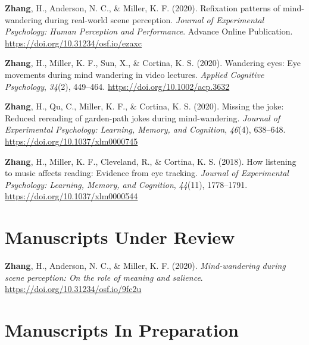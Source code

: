 \documentclass[11pt, a4paper]{awesome-cv}
\begin{document}
\begingroup
\setlength{\parindent}{-0.5in}
\setlength{\leftskip}{0.5in}

\hypertarget{refs_published}{}
\leavevmode\hypertarget{ref-zhang_scan-paths_2020}{}%
\textbf{Zhang}, H., Anderson, N. C., \& Miller, K. F. (2020). Refixation
patterns of mind-wandering during real-world scene perception.
\emph{Journal of Experimental Psychology: Human Perception and
Performance}. Advance Online Publication.
\url{https://doi.org/10.31234/osf.io/ezaxc}

\leavevmode\hypertarget{ref-zhang_wandering_2020}{}%
\textbf{Zhang}, H., Miller, K. F., Sun, X., \& Cortina, K. S. (2020).
Wandering eyes: Eye movements during mind wandering in video lectures.
\emph{Applied Cognitive Psychology}, \emph{34}(2), 449--464.
\url{https://doi.org/10.1002/acp.3632}

\leavevmode\hypertarget{ref-zhang_missing_2019}{}%
\textbf{Zhang}, H., Qu, C., Miller, K. F., \& Cortina, K. S. (2020).
Missing the joke: Reduced rereading of garden-path jokes during
mind-wandering. \emph{Journal of Experimental Psychology: Learning,
Memory, and Cognition}, \emph{46}(4), 638--648.
\url{https://doi.org/10.1037/xlm0000745}

\leavevmode\hypertarget{ref-zhang_how_2018}{}%
\textbf{Zhang}, H., Miller, K. F., Cleveland, R., \& Cortina, K. S.
(2018). How listening to music affects reading: Evidence from eye
tracking. \emph{Journal of Experimental Psychology: Learning, Memory,
and Cognition}, \emph{44}(11), 1778--1791.
\url{https://doi.org/10.1037/xlm0000544}

\endgroup

\hypertarget{manuscripts-under-review}{%
\section{Manuscripts Under Review}\label{manuscripts-under-review}}

\begingroup
\setlength{\parindent}{-0.5in}
\setlength{\leftskip}{0.5in}

\hypertarget{refs_underreview}{}
\leavevmode\hypertarget{ref-zhang_meaning_2020}{}%
\textbf{Zhang}, H., Anderson, N. C., \& Miller, K. F. (2020).
\emph{Mind-wandering during scene perception: On the role of meaning and
salience}. \url{https://doi.org/10.31234/osf.io/9fc2u}

\endgroup

\hypertarget{manuscripts-in-preparation}{%
\section{Manuscripts In Preparation}\label{manuscripts-in-preparation}}
\end{document}
